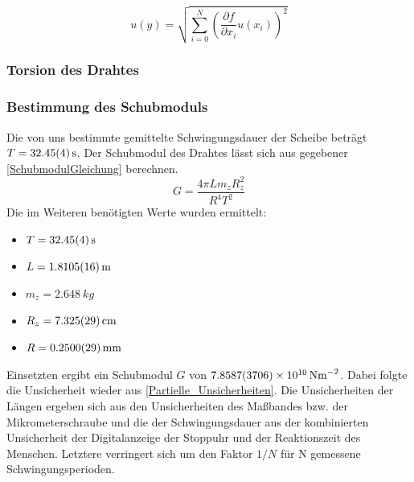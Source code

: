 \documentclass[
	a4paper,
	12pt,
	pagesize,
	ngerman
]{scrartcl}
\begin{document}
	\begin{equation}
	u(y) = \sqrt{  \sum_{i=0}^{N} \left( \frac{\partial f}{\partial x_i}u(x_i)\right)^2  }
	\label{Partielle_Unsicherheiten}
	\end{equation}
	
	\subsubsection{Torsion des Drahtes}
	\subsubsection*{Bestimmung des Schubmoduls}
	Die von uns bestimmte gemittelte Schwingungsdauer der Scheibe beträgt $T=\SI{32,45 \pm 0,04}{s}$.
	Der Schubmodul des Drahtes lässt sich aus gegebener \cref{SchubmodulGleichung} berechnen.
	\begin{equation}
		\label{SchubmodulGleichung}
		G = \frac{4\pi Lm_zR_z^2}{R^4T^2}
	\end{equation}
	Die im Weiteren benötigten Werte wurden ermittelt: 
	\begin{itemize}
		\item $T=\SI{32,45 \pm 0,04}{s}$
		\item $L = \SI{1,8105 \pm 0,0016 }{m}$
		\item $m_z = \SI{2,648}{kg}$
		\item $R_z = \SI{7,325 \pm 0,029}{cm}$
		\item $R = \SI{0,25 \pm 0,0029}{mm}$
	\end{itemize}
	Einsetzten ergibt ein Schubmodul $G$ von $\SI{7,8587\pm 0,3706e10}{Nm^{-2}}$. Dabei folgte die Unsicherheit wieder aus \cref{Partielle_Unsicherheiten}.
	Die Unsicherheiten der Längen ergeben sich aus den Unsicherheiten des Maßbandes bzw. der Mikrometerschraube und die der Schwingungsdauer aus der kombinierten Unsicherheit der Digitalanzeige der Stoppuhr und der Reaktionszeit des Menschen. Letztere verringert sich um den Faktor $1/N $ für N gemessene Schwingungsperioden.
\end{document}
